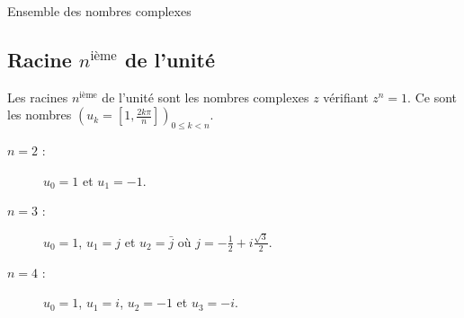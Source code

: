 \begin{chapter}{Ensemble des nombres complexes}
\subsection{Racine $n^{\text{i\`eme}}$ de l'unit\'e}
%
Les racines $n^{\text{i\`eme}}$ de l'unit\'e sont les nombres complexes $z$ v\'erifiant $z^n=1$.
Ce sont les nombres $\left(u_k = \left[ 1,\frac{2k\pi}{n} \right] \right)_{0\leq k <n}$.
\begin{ex}\vspace{-1\baselineskip}
      \begin{description}
            \item[$n=2$ :] $u_0 = 1$ et $u_1 = -1$.
            \item[$n=3$ :] $u_0 = 1$, $u_1 = j$ et $u_2 = \bar{j}$ o\`u $j = -\frac{1}{2}+i\frac{\sqrt{3}}{2}$.
            \item[$n=4$ :] $u_0 = 1$, $u_1 = i$, $u_2 = -1$ et $u_3 = -i$.
      \end{description}
\end{ex}


\end{chapter}
